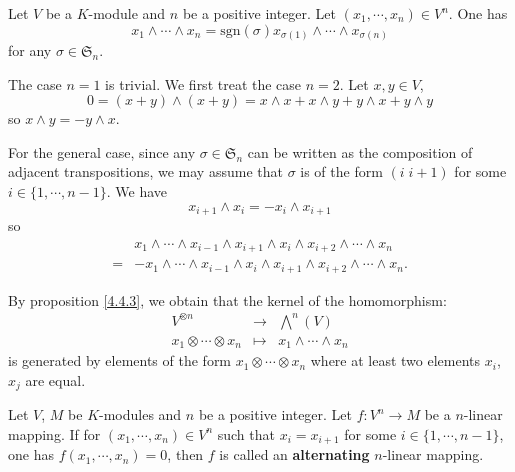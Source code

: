 \begin{propositionenv}\label{4.4.3}
    Let $V$ be a $K$-module and $n$ be a positive integer.
    Let $(x_1,\cdots,x_n) \in V^n$.
    One has
    $$ x_1 \wedge \cdots \wedge x_n = \mathrm{sgn}(\sigma) x_{\sigma(1)} \wedge \cdots \wedge x_{\sigma(n)}$$
    for any $\sigma \in \mathfrak{S}_n$.
\end{propositionenv}
\begin{proofenv}
    The case $n = 1$ is trivial.
    We first treat the case $n = 2$.
    Let $x,y \in V$,
    $$ 0 = \left(x + y\right)\wedge\left(x + y\right) = x\wedge x + x\wedge y + y \wedge x + y \wedge y$$
    so $x \wedge y = - y \wedge x$.

    \quad For the general case, since any $\sigma \in \mathfrak{S}_n$ can be written as the composition of adjacent transpositions, we may assume that $\sigma$ is of the form $(i\; i+1)$ for some $i \in \{1,\cdots, n-1\}$.
    We have
    $$ x_{i+1} \wedge x_i = - x_i \wedge x_{i+1}$$
    so
    $$\begin{aligned}
        & x_1 \wedge \cdots \wedge x_{i-1} \wedge x_{i+1} \wedge x_i \wedge x_{i+2} \wedge \cdots \wedge x_n\\
        = & - x_1 \wedge \cdots \wedge x_{i-1} \wedge x_i \wedge x_{i+1} \wedge x_{i+2} \wedge \cdots \wedge x_n.
    \end{aligned}$$
\end{proofenv}

\begin{remark}
    By proposition \ref{4.4.3}, we obtain that the kernel of the homomorphism:
    $$\begin{array}{rcl}
        V^{\otimes n} & \longrightarrow & \bigwedge^n (V)\\
        x_1 \otimes \cdots \otimes x_n & \longmapsto & x_1 \wedge \cdots \wedge x_n
    \end{array}$$
    is generated by elements of the form $x_1 \otimes \cdots \otimes x_n$ where at least two elements $x_i$, $x_j$ are equal.
\end{remark}

\begin{definitionenv}
    Let $V$, $M$ be $K$-modules and $n$ be a positive integer.
    Let $f: V^n \rightarrow M$ be a $n$-linear mapping.
    If for $(x_1,\cdots,x_n) \in V^n$ such that $x_i = x_{i+1}$ for some $i \in \{1,\cdots,n-1\}$, one has $f(x_1,\cdots,x_n) = 0$, then $f$ is called an \textbf{alternating} $n$-linear mapping.
\end{definitionenv}

